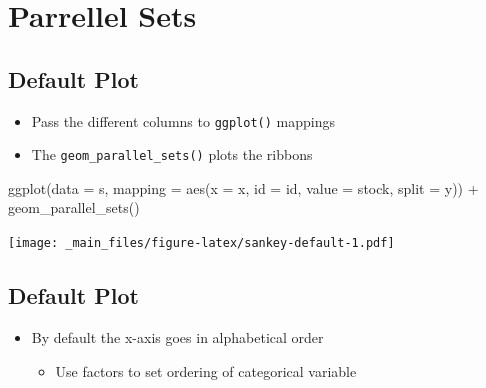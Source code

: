 \documentclass[
]{book}
\newenvironment{Shaded}{\begin{snugshade}}{\end{snugshade}}
\newcommand{\AttributeTok}[1]{\textcolor[rgb]{0.77,0.63,0.00}{#1}}
\newcommand{\FunctionTok}[1]{\textcolor[rgb]{0.00,0.00,0.00}{#1}}
\newcommand{\NormalTok}[1]{#1}
\newcommand{\SpecialCharTok}[1]{\textcolor[rgb]{0.00,0.00,0.00}{#1}}
\providecommand{\tightlist}{%
  \setlength{\itemsep}{0pt}\setlength{\parskip}{0pt}}
\begin{document}
\hypertarget{parrellel-sets}{%
\section{Parrellel Sets}\label{parrellel-sets}}

\hypertarget{default-plot}{%
\subsection{Default Plot}\label{default-plot}}

\begin{itemize}
\tightlist
\item
  Pass the different columns to \texttt{ggplot()} mappings
\item
  The \texttt{geom\_parallel\_sets()} plots the ribbons
\end{itemize}

\begin{Shaded}
\begin{Highlighting}[]
\FunctionTok{ggplot}\NormalTok{(}\AttributeTok{data =}\NormalTok{ s,}
       \AttributeTok{mapping =} \FunctionTok{aes}\NormalTok{(}\AttributeTok{x =}\NormalTok{ x, }\AttributeTok{id =}\NormalTok{ id, }\AttributeTok{value =}\NormalTok{ stock, }\AttributeTok{split =}\NormalTok{ y)) }\SpecialCharTok{+}
  \FunctionTok{geom\_parallel\_sets}\NormalTok{()}
\end{Highlighting}
\end{Shaded}

\texttt{[image: \_main\_files/figure-latex/sankey-default-1.pdf]}

\hypertarget{default-plot-1}{%
\subsection{Default Plot}\label{default-plot-1}}

\begin{itemize}
\tightlist
\item
  By default the x-axis goes in alphabetical order

  \begin{itemize}
  \tightlist
  \item
    Use factors to set ordering of categorical variable
  \end{itemize}
\end{itemize}

\begin{Shaded}
\end{Shaded}
\end{document}
